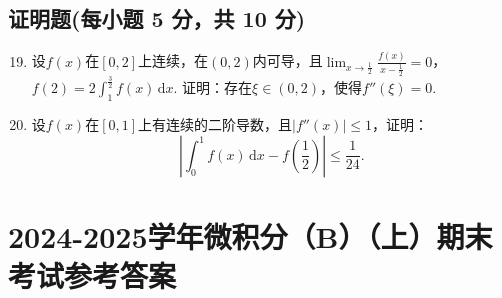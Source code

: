 \documentclass[../Main.tex]{subfiles}
\begin{document}
\section{证明题(每小题 5 分，共 10 分)}
\begin{enumerate}
    \setcounter{enumi}{18}
    \item 设$f(x)$在$[0,2]$上连续，在$(0,2)$内可导，且$\lim_{x\to\frac{1}{2}}
              \frac{f(x)}{x-\frac{1}{2}}=0$，$f(2)=2\int_{1}^{\frac{3}{2}}f(x)\,\mathrm{d}x$.
          证明：存在$\xi\in(0,2)$，使得$f''(\xi)=0$.
          \vspace{13em}

    \item 设$f(x)$在$[0,1]$上有连续的二阶导数，且$|f''(x)|\leq1$，证明：
          \[
              \left|\int_{0}^{1}f(x)\,\mathrm{d}x-f\left(\frac{1}{2}\right)\right|\leq\frac{1}{24}
              .
          \]
          \vspace{13em}
\end{enumerate}

\chapter{2024-2025学年微积分（B）（上）期末考试参考答案}
\end{document}
